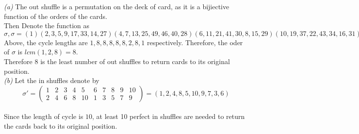 \documentclass[11pt]{article}
\newenvironment{problem}[2][Problem]{\begin{trivlist}
\item[\hskip \labelsep {\bfseries #1}\hskip \labelsep {\bfseries #2.}]}{\end{trivlist}}
\begin{document}
\begin{problem}{(4)}
\textit{(a)} The out shuffle is a permutation on the deck of card, as it is a bijiective function of the orders of the cards.\\
Then Denote the function as $\sigma, \sigma = (1)(2,3,5,9,17,33,14,27)(4,7,13,25,49,46,40,28)(6,11,21,41,30,8,15,29)(10,19,37,22,43,34,16,31)(12,23,45,38,24,47,42,32)
(18,35)(20,39,26,51,50,48,44,36)(52)$\\
Above, the cycle lengths are $1,8,8,8,8,8,2,8,1$ respectively. Therefore, the oder of $\sigma$ is $lcm (1,2,8) = 8$.\\
Therefore $8$ is the least number of out shuffles to return cards to its original position.\\
\textit{(b)} Let the in shuffles denote by \[ \sigma ' = \begin{pmatrix} 1&2&3&4&5&6&7&8&9&10\\ 2&4&6&8&10&1&3&5&7&9 \end{pmatrix} = (1,2,4,8,5,10,9,7,3,6)\]\\
Since the length of cycle is $10$, at least 10 perfect in shuffles are needed to return the cards back to its original position.\\
\end{problem}

\begin{problem}{(5)}

\end{problem}
\end{document}
